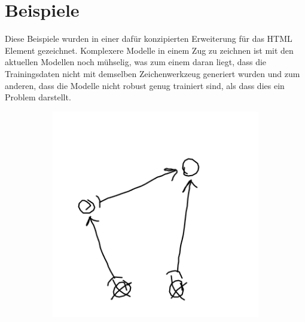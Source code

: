 \section{Beispiele}
Diese Beispiele wurden in einer dafür konzipierten Erweiterung für das  HTML Element gezeichnet.
Komplexere Modelle in einem Zug zu zeichnen ist mit den aktuellen Modellen noch mühselig, was zum einem daran liegt, dass die Trainingsdaten nicht mit demselben Zeichenwerkzeug generiert wurden und zum anderen, dass die Modelle nicht robust genug trainiert sind, als dass dies ein Problem darstellt.

\begin{figure}[H]
    \centering
    \begin{subfigure}[b]{0.3\textwidth}
        \includegraphics[width=\textwidth]{images/4bar_sketch.png}
        \caption{}
        \label{fig:4bar_sketch}
    \end{subfigure}
    \begin{subfigure}[b]{0.3\textwidth}

\end{subfigure}
\end{figure}
